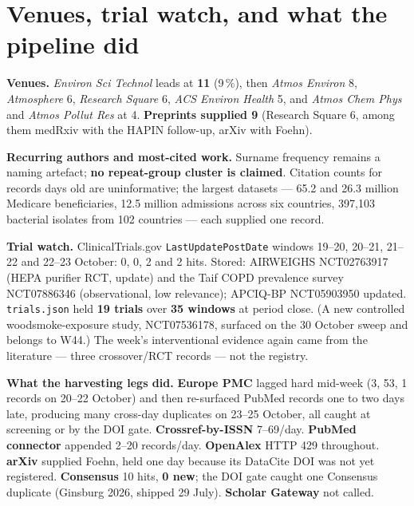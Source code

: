 \documentclass[10pt]{article}
\begin{document}
\vspace{4mm}

\section*{\sffamily\bfseries\color{Deep}Venues, trial watch, and what the pipeline did}
\vspace{-1.5mm}{\color{Teal}\rule{\linewidth}{1.1pt}}\vspace{2.5mm}

\footnotesize
\textbf{Venues.} \textit{Environ Sci Technol} leads at \textbf{11} (9\,\%), then \textit{Atmos Environ} 8,
\textit{Atmosphere} 6, \textit{Research Square} 6, \textit{ACS Environ Health} 5, and \textit{Atmos Chem Phys}
and \textit{Atmos Pollut Res} at 4. \textbf{Preprints supplied 9} (Research Square 6, among them medRxiv with the HAPIN
follow-up, arXiv with Foehn).

\vspace{1.5mm}
\textbf{Recurring authors and most-cited work.} Surname frequency remains a naming artefact; \textbf{no
repeat-group cluster is claimed}. Citation counts for records days old are uninformative; the largest datasets
--- 65.2 and 26.3 million Medicare beneficiaries, 12.5 million admissions across six countries, 397,103 bacterial
isolates from 102 countries --- each supplied one record.

\vspace{1.5mm}
\textbf{Trial watch.} ClinicalTrials.gov \texttt{LastUpdatePostDate} windows 19--20, 20--21, 21--22 and 22--23
October: 0, 0, 2 and 2 hits. Stored: AIRWEIGHS NCT02763917 (HEPA purifier RCT, update) and the Taif COPD
prevalence survey NCT07886346 (observational, low relevance); APCIQ-BP NCT05903950 updated. \texttt{trials.json}
held \textbf{19 trials} over \textbf{35 windows} at period close. (A new controlled woodsmoke-exposure study,
NCT07536178, surfaced on the 30 October sweep and belongs to W44.) The week's interventional evidence again came
from the literature --- three crossover/RCT records --- not the registry.

\vspace{1.5mm}
\textbf{What the harvesting legs did.} \textbf{Europe PMC} lagged hard mid-week (3, 53, 1 records on 20--22
October) and then re-surfaced PubMed records one to two days late, producing many cross-day duplicates on
23--25 October, all caught at screening or by the DOI gate. \textbf{Crossref-by-ISSN} 7--69/day. \textbf{PubMed
connector} appended 2--20 records/day. \textbf{OpenAlex} HTTP 429 throughout. \textbf{arXiv} supplied Foehn,
held one day because its DataCite DOI was not yet registered. \textbf{Consensus} 10 hits, \textbf{0 new}; the DOI
gate caught one Consensus duplicate (Ginsburg 2026, shipped 29 July). \textbf{Scholar Gateway} not called.
\end{document}
